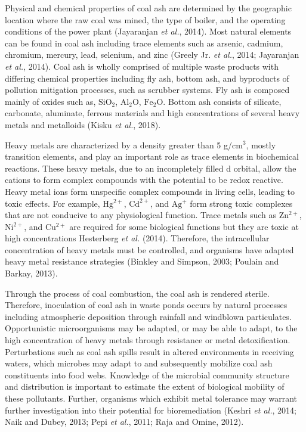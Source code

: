 \documentclass[ms, hidelinks]{uncgdissertationexp3}
\theoremstyle{plain}
\theoremstyle{definition}
\theoremstyle{remark}
\begin{document}
Physical and chemical properties of coal ash are determined by the geographic location where the raw coal was mined, the type of boiler, and the operating conditions of the power plant (Jayaranjan \emph{et al.}, 2014). Most natural elements can be found in coal ash including trace elements such as arsenic, cadmium, chromium, mercury, lead, selenium, and zinc (Greely Jr. \emph{et al.}, 2014; Jayaranjan \emph{et al.}, 2014). Coal ash is wholly comprised of multiple waste products with differing chemical properties including fly ash, bottom ash, and byproducts of pollution mitigation processes, such as scrubber systems. Fly ash is composed mainly of oxides such as, \(\mathrm{SiO_2}\), \(\mathrm{Al_2O}\), \(\mathrm{Fe_2O}\). Bottom ash consists of silicate, carbonate, aluminate, ferrous materials and high concentrations of several heavy metals and metalloids (Kisku \emph{et al.}, 2018).

Heavy metals are characterized by a density greater than 5 g/\(\mathrm{cm^3}\), mostly transition elements, and play an important role as trace elements in biochemical reactions. These heavy metals, due to an incompletely filled d orbital, allow the cations to form complex compounds with the potential to be redox reactive. Heavy metal ions form unspecific complex compounds in living cells, leading to toxic effects. For example, \(\mathrm{Hg^{2+}}\), \(\mathrm{Cd^{2+}}\), and \(\mathrm{Ag^{+}}\) form strong toxic complexes that are not conducive to any physiological function. Trace metals such as \(\mathrm{Zn^{2+}}\), \(\mathrm{Ni^{2+}}\), and \(\mathrm{Cu^{2+}}\) are required for some biological functions but they are toxic at high concentrations Hesterberg \emph{et al.} (2014). Therefore, the intracellular concentration of heavy metals must be controlled, and organisms have adapted heavy metal resistance strategies (Binkley and Simpson, 2003; Poulain and Barkay, 2013).

Through the process of coal combustion, the coal ash is rendered sterile. Therefore, inoculation of coal ash in waste ponds occurs by natural processes including atmospheric deposition through rainfall and windblown particulates. Opportunistic microorganisms may be adapted, or may be able to adapt, to the high concentration of heavy metals through resistance or metal detoxification. Perturbations such as coal ash spills result in altered environments in receiving waters, which microbes may adapt to and subsequently mobilize coal ash constituents into food webs. Knowledge of the microbial community structure and distribution is important to estimate the extent of biological mobility of these pollutants. Further, organisms which exhibit metal tolerance may warrant further investigation into their potential for bioremediation (Keshri \emph{et al.}, 2014; Naik and Dubey, 2013; Pepi \emph{et al.}, 2011; Raja and Omine, 2012).
\end{document}

